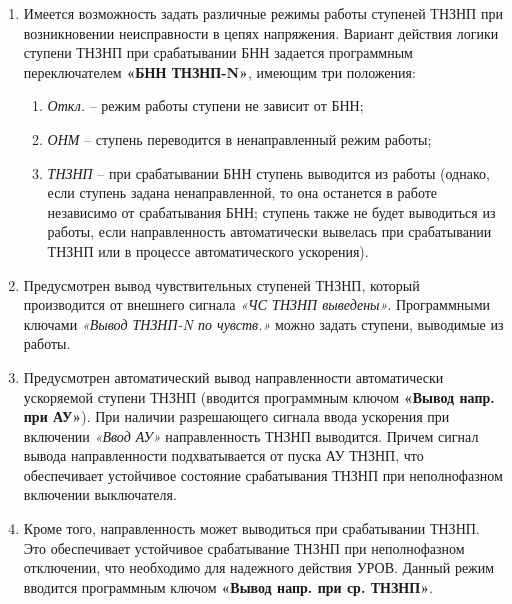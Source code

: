 \begin{enumerate}[label=\arabic{section}.\arabic{subsection}.\arabic{enumi}, labelsep=4pt, leftmargin=0pt, itemindent=57pt, itemsep=0pt, parsep=5pt]
\begin{enumerate}[label=\arabic{section}.\arabic{subsection}.\arabic{enumi}.\arabic*, labelsep=4pt, leftmargin=0em, itemindent=65pt, parsep=0pt]
\item
Имеется возможность задать различные режимы работы ступеней ТНЗНП при возникновении неисправности в цепях напряжения. Вариант действия логики ступени ТНЗНП при срабатывании БНН задается программным переключателем \textbf{«БНН ТНЗНП-N»}, имеющим три положения:

\begin{enumerate}[label=\arabic*)]
\item \textit{Откл.} -- режим работы ступени не зависит от БНН;
\item \textit{ОНМ} -- ступень переводится в ненаправленный режим работы;
\item \textit{ТНЗНП} --  при срабатывании БНН ступень выводится из работы (однако, если ступень задана ненаправленной, то она останется в работе независимо от срабатывания БНН; ступень также не будет выводиться из работы, если направленность автоматически вывелась при срабатывании ТНЗНП или в процессе автоматического ускорения).
\end{enumerate}

\item
Предусмотрен вывод чувствительных ступеней ТНЗНП, который производится от внешнего сигнала \textit{«ЧС ТНЗНП выведены»}. Программными ключами \textit{«Вывод ТНЗНП-N по чувств.»} можно задать ступени, выводимые из работы.

\item
Предусмотрен автоматический вывод направленности автоматически ускоряемой ступени ТНЗНП (вводится программным ключом \textbf{«Вывод напр. при АУ»}). При наличии разрешающего сигнала ввода ускорения при включении \textit{«Ввод АУ»} направленность ТНЗНП выводится. Причем сигнал вывода направленности подхватывается от пуска АУ ТНЗНП, что обеспечивает устойчивое состояние срабатывания ТНЗНП при неполнофазном включении выключателя. 

\item
Кроме того, направленность может выводиться при срабатывании ТНЗНП. Это обеспечивает устойчивое срабатывание ТНЗНП при неполнофазном отключении, что необходимо для надежного действия УРОВ. Данный режим вводится программным ключом \textbf{«Вывод напр. при ср. ТНЗНП»}.


\end{enumerate}
\end{enumerate}
